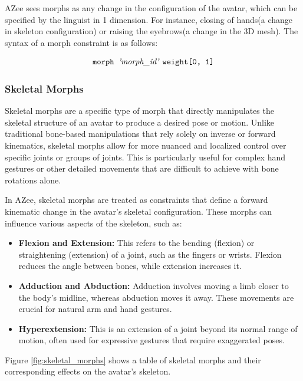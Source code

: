 \documentclass[../../main.tex]{subfiles}
\begin{document}
AZee sees morphs as any change in the configuration of the avatar, which can be specified by the linguist in 1 dimension. For instance, closing of hands(a change in skeleton configuration) or raising the eyebrows(a change in the 3D mesh). The syntax of a morph constraint is as follows:

\[
\texttt{morph } \text{\emph{'morph\_id'}} \ \texttt{weight[0, 1]}
\]

\subsubsection{Skeletal Morphs}
\label{ch:rigging_layers:proc_rig_signing_avatars:morph_constraints:skel_morphs}

Skeletal morphs are a specific type of morph that directly manipulates the skeletal structure of an avatar to produce a desired pose or motion. Unlike traditional bone-based manipulations that rely solely on inverse or forward kinematics, skeletal morphs allow for more nuanced and localized control over specific joints or groups of joints. This is particularly useful for complex hand gestures or other detailed movements that are difficult to achieve with bone rotations alone.

In AZee, skeletal morphs are treated as constraints that define a forward kinematic change in the avatar's skeletal configuration. These morphs can influence various aspects of the skeleton, such as:

\begin{itemize}
    \item \textbf{Flexion and Extension:} This refers to the bending (flexion) or straightening (extension) of a joint, such as the fingers or wrists. Flexion reduces the angle between bones, while extension increases it.
    \item \textbf{Adduction and Abduction:} Adduction involves moving a limb closer to the body's midline, whereas abduction moves it away. These movements are crucial for natural arm and hand gestures.
    \item \textbf{Hyperextension:} This is an extension of a joint beyond its normal range of motion, often used for expressive gestures that require exaggerated poses.
\end{itemize}

Figure \ref{fig:skeletal_morphs} shows a table of skeletal morphs and their corresponding effects on the avatar's skeleton.
\end{document}
